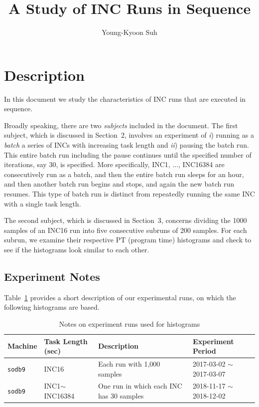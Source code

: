 \documentclass[10pt]{article}
\begin{document}
\title{A Study of INC Runs in Sequence}

\author{
Young-Kyoon Suh\\
}
\maketitle

\section{Description}
In this document we study the characteristics of INC runs that are executed in sequence. 

Broadly speaking, there are two {\em subjects} included in the document.
The first subject, which is discussed in Section~2, involves an experiment of {\it i}) running as a {\em batch} a series of INCs with increasing task length and {\it ii}) pausing the batch run. This entire batch run including the pause continues until the specified number of iterations, say 30, is specified. More specifically, INC1, ..., INC16384 are consecutively run as a batch, and 
then the entire batch run sleeps for an hour, and then another batch run begins and stops, and again the new batch run resumes. This type of batch run is distinct from repeatedly running the same INC with a single task length.

The second subject, which is discussed in Section~3, concerns dividing 
the 1000 samples of an INC16 run into five consecutive subruns of 200 samples.  
For each subrun, we examine their respective PT (program time) histograms 
and check to see if the histograms look similar to each other. 

\subsection{Experiment Notes}
Table~\ref{tab:exp_notes} provides a short description of our experimental runs, 
on which the following histograms are based.

\begin{table}[h]
\begin{center}
\begin{tabular}{|p{2cm}|p{3cm}|p{6cm}|p{4cm}|} \hline
Machine & Task Length (sec) & Description & Experiment Period\\ \hline
{\tt sodb9} &  INC16 & Each run with 1,000 samples & 2017-03-02 $\sim$ 2017-03-07\\ \hline
{\tt sodb9} &  INC1$\sim$INC16384 & One run in which each INC has 30 samples & 2018-11-17 $\sim$ 2018-12-02\\ \hline
\end{tabular}
\end{center}
\vspace{-.2in}
\caption{Notes on experiment runs used for histograms\label{tab:exp_notes}}
\end{table}
\end{document}
